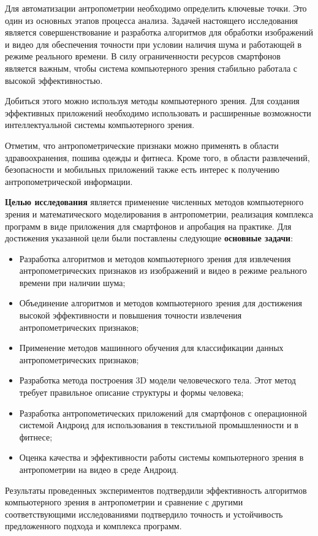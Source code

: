 Для автоматизации антропометрии необходимо определить ключевые точки. Это один из основных этапов процесса анализа. Задачей настоящего исследования является совершенствование и разработка алгоритмов для обработки изображений и видео для обеспечения точности при условии наличия шума и работающей в режиме реального времени. В силу ограниченности ресурсов смартфонов является важным, чтобы система компьютерного зрения стабильно работала с высокой эффективностью.

Добиться этого можно используя методы компьютерного зрения. Для создания эффективных приложений необходимо использовать и расширенные возможности интеллектуальной системы компьютерного зрения.

Отметим, что антропометрические признаки можно применять в области здравоохранения, пошива одежды и фитнеса. Кроме того, в области развлечений, безопасности и мобильных приложений также есть интерес к получению антропометрической информации.

\textbf{Целью исследования} является применение численных методов компьютерного зрения и математического моделирования в антропометрии, реализация комплекса программ в виде приложения для смартфонов и апробация на практике. Для достижения указанной цели были поставлены следующие \textbf {основные задачи}:
\begin{itemize}
	\item Разработка алгоритмов и методов компьютерного зрения для извлечения антропометрических признаков из изображений и видео в режиме реального времени при наличии шума;
	\item Объединение алгоритмов и методов компьютерного зрения для достижения высокой эффективности и повышения точности извлечения антропометрических признаков;
	\item Применение методов машинного обучения для классификации данных антропометрических признаков;
	\item Разработка метода построения 3D модели человеческого тела. Этот метод требует правильное описание структуры и формы человека;
	\item Разработка антропометических приложений для смартфонов с операционной системой Андроид для использования в текстильной промышленности и в фитнесе;
	\item Оценка качества и эффективности работы системы компьютерного зрения в антропометрии на видео в среде Андроид.
\end{itemize}
Результаты проведенных экспериментов подтвердили эффективность алгоритмов компьютерного зрения в антропометрии и сравнение с другими соответствующими исследованиями подтвердило точность и устойчивость предложенного подхода и комплекса программ. 

